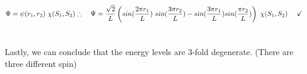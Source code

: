 \documentclass[fleqn]{article}
\begin{document}
\begin{enumerate}
{        \\
        \\
        $
          \Psi=\psi(r_1, r_2) ~ \chi(S_1, S_2)
          \\
          \\
          \\
          \therefore ~~~ \Psi=\dfrac{\sqrt{2}}{L} \left(
            sin(\dfrac{2\pi r_1}{L}) ~ sin(\dfrac{3 \pi r_2}{L})
            -sin(\dfrac{3 \pi r_1}{L}) sin(\dfrac{\pi r_2}{L})
          \right) ~ \chi(S_1, S_2) ~~~~ \checkmark
        $
        \\
        \\
        \\
        Lastly, we can conclude that the energy levels are 3-fold degenerate. (There are three different spin)
        \\
      }
  
  \end{enumerate}
\end{document}
